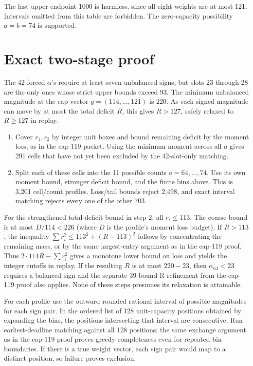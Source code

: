 \documentclass[11pt,letterpaper]{article}
\providecommand{\tightlist}{\setlength{\itemsep}{0pt}\setlength{\parskip}{0pt}}
\begin{document}
The last upper endpoint 1000 is harmless, since all eight weights are at
most 121. Intervals omitted from this table are forbidden. The
zero-capacity possibility \(a=b=74\) is supported.

\section{Exact two-stage proof}\label{exact-two-stage-proof}

The 42 forced \(\alpha\)'s require at least seven unbalanced signs, but
slots 23 through 28 are the only ones whose strict upper bounds exceed
93. The minimum unbalanced magnitude at the cap vector
\(y=(114,\ldots,121)\) is 220. As each signed magnitude can move by at
most the total deficit \(R\), this gives \(R>127\), safely relaxed to
\(R\ge127\) in replay.

\begin{enumerate}
\def\labelenumi{\arabic{enumi}.}
\tightlist
\item
  Cover \(r_1,r_2\) by integer unit boxes and bound remaining deficit by
  the moment loss, as in the cap-119 packet. Using the minimum moment
  across all \(a\) gives 291 cells that have not yet been excluded by
  the 42-slot-only matching.
\item
  Split each of these cells into the 11 possible counts
  \(a=64,\ldots,74\). Use its own moment bound, stronger deficit bound,
  and the finite bins above. This is 3,201 cell/count profiles.
  Loss/tail bounds reject 2,498, and exact interval matching rejects
  every one of the other 703.
\end{enumerate}

For the strengthened total-deficit bound in step 2, all \(r_i\le113\).
The coarse bound is at most \(D/114<226\) (where \(D\) is the profile's
moment loss budget). If \(R>113\), the inequality
\(\sum r_i^2\le113^2+(R-113)^2\) follows by concentrating the remaining
mass, or by the same largest-entry argument as in the cap-119 proof.
Thus \(2\cdot114 R-\sum r_i^2\) gives a monotone lower bound on loss and
yields the integer cutoffs in replay. If the resulting \(R\) is at most
\(220-23\), then \(\alpha_{64}<23\) requires a balanced sign and the
separate 39-bound R refinement from the cap-119 proof also applies. None
of these steps presumes its relaxation is attainable.

For each profile use the outward-rounded rational interval of possible
magnitudes for each sign pair. In the ordered list of 128 unit-capacity
positions obtained by expanding the bins, the positions intersecting
that interval are consecutive. Run earliest-deadline matching against
all 128 positions; the same exchange argument as in the cap-119 proof
proves greedy completeness even for repeated bin boundaries. If there is
a true weight vector, each sign pair would map to a distinct position,
so failure proves exclusion.
\end{document}
